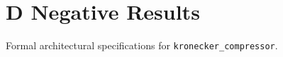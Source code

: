 \section{D Negative Results}

Formal architectural specifications for \texttt{kronecker_compressor}.
